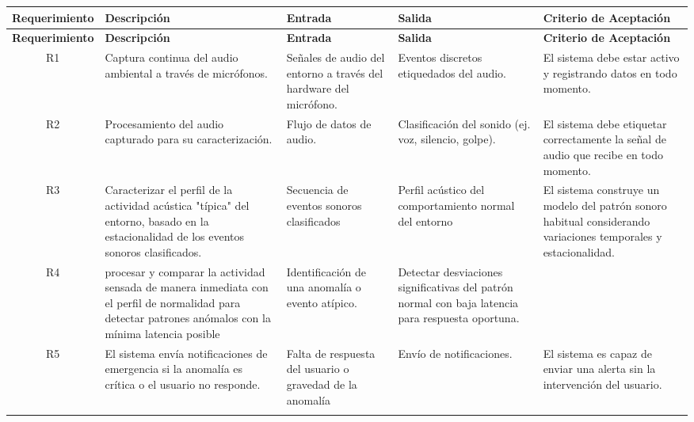 {\small
  \begin{longtable}[c]{c p{3.5cm} p{2.2cm} p{2.2cm} p{3.5cm}}
    \hline
    \textbf{Requerimiento} & \textbf{Descripción}                                                                                    & \textbf{Entrada}                                                  & \textbf{Salida}                                                       & \textbf{Criterio de Aceptación}                                                       \\
    \hline
    \endfirsthead

    \hline
    \textbf{Requerimiento} & \textbf{Descripción}                                                                                    & \textbf{Entrada}                                                  & \textbf{Salida}                                                       & \textbf{Criterio de Aceptación}                                                       \\
    \hline
    \endhead
    \endfoot
    \endlastfoot

    R1                     & Captura continua del audio ambiental a través de micrófonos.                                            & Señales de audio del entorno a través del hardware del micrófono. & Eventos discretos etiquedados del audio.                              & El sistema debe estar activo y registrando datos en todo momento.                     \\
    \addlinespace
    R2                     & Procesamiento del audio capturado para su caracterización.                              & Flujo de datos de audio.                                          & Clasificación del sonido (ej. voz, silencio, golpe).                  & El sistema debe etiquetar correctamente la señal de audio que recibe en todo momento. \\
    \addlinespace
    R3                     & Caracterizar el perfil de la actividad acústica "típica" del entorno, basado en la estacionalidad de los eventos sonoros clasificados.                & Secuencia de eventos sonoros clasificados & Perfil acústico del comportamiento normal del entorno               & El sistema construye un modelo del patrón sonoro habitual considerando variaciones temporales y estacionalidad.            \\
    \addlinespace
    R4                     & procesar y comparar la actividad sensada de manera inmediata con el perfil de normalidad para detectar patrones anómalos con la mínima latencia posible                               & Identificación de una anomalía o evento atípico.                      & Detectar desviaciones significativas del patrón normal con baja latencia para respuesta oportuna.                             \\
    \addlinespace
    R5                     & El sistema envía notificaciones de emergencia si la anomalía es crítica o el usuario no responde.       & Falta de respuesta del usuario o gravedad de la anomalía          & Envío de notificaciones.                                              & El sistema es capaz de enviar una alerta sin la intervención del usuario.             \\
    \bottomrule
    \addlinespace


\end{longtable}}
